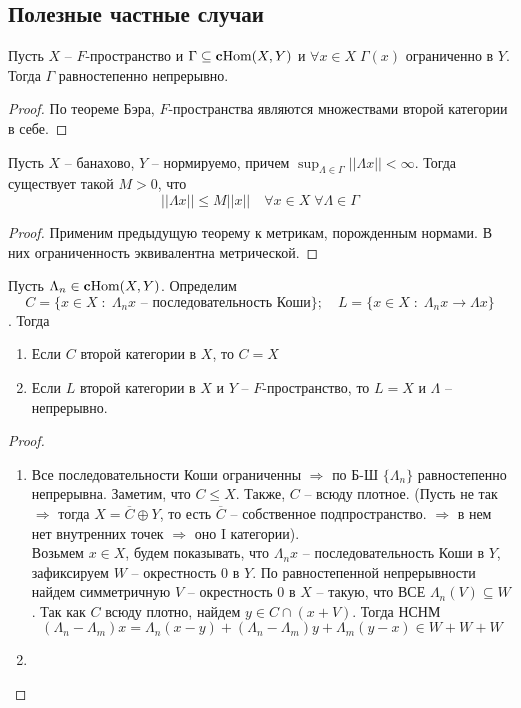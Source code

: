 \documentclass[12pt, a4paper, oneside]{book}
\begin{document}
\subsection{Полезные частные случаи}
\begin{theorem}
    Пусть $X$ -- $F$-пространство и $\Gamma \subseteq \text{\textbf{c}Hom}(X,Y)$ и $\forall x \in X \; \Gamma(x)$ ограниченно в $Y$.
    Тогда $\Gamma$ равностепенно непрерывно.
\end{theorem}
\begin{proof}
По теореме Бэра, $F$-пространства являются множествами второй категории в себе.
\end{proof}
\begin{theorem}
    Пусть $X$ -- банахово, $Y$ -- нормируемо, причем $\sup_{\Lambda \in \Gamma} ||\Lambda x || < \infty$. Тогда существует такой $M > 0$, что
    $$||\Lambda x|| \leqslant M ||x||\quad \forall x \in X \; \forall \Lambda \in \Gamma$$
\end{theorem}
\begin{proof}
Применим предыдущую теорему к метрикам, порожденным нормами. В них ограниченность эквивалентна метрической.
\end{proof}
\begin{theorem}
    Пусть $\Lambda_n \in \text{\textbf{c}Hom}(X,Y)$. Определим $$ C = \{x \in X\; : \; \Lambda_n x \text{ -- последовательность Коши}   \}; \quad  L = \{x \in X \; : \; \Lambda_n x \to \Lambda x \}$$.
    Тогда
    \begin{enumerate}
        \item Если $C$ второй категории в $X$, то $C = X$
        \item Если $L$ второй категории в $X$ и $Y$ -- $F$-пространство, то $L = X$ и $\Lambda$ -- непрерывно.
    \end{enumerate}
\end{theorem}
\begin{proof}\ \\
\begin{enumerate}
    \item Все последовательности Коши ограниченны $\Rightarrow $ по Б-Ш $\{\Lambda_n\}$ равностепенно непрерывна.
    Заметим, что $C \leqslant X$. Также, $C$ -- всюду плотное. \big({\small Пусть не так $\Rightarrow$ тогда $X = \overline{C} \oplus Y$, то есть $\overline{C}$ -- собственное подпространство.
    $\Rightarrow$ в нем нет внутренних точек $\Rightarrow$ оно I категории}\big).
    \ \\ Возьмем $x \in X$, будем показывать, что $\Lambda_n x$ -- последовательность Коши в $Y$, зафиксируем $W$ -- окрестность 0 в $Y$.
    По равностепенной непрерывности найдем симметричную $V$ -- окрестность 0 в $X$ -- такую, что ВСЕ $\Lambda_n(V) \subseteq W$.
    Так как $C$ всюду плотно, найдем $y \in C \cap \left(x+V \right)$. Тогда НСНМ
    $$(\Lambda_n - \Lambda_m)x = \Lambda_n(x-y) + (\Lambda_n - \Lambda_m)y + \Lambda_m(y-x) \in W + W + W$$
    \item
\end{enumerate}
\end{proof}
\end{document}
